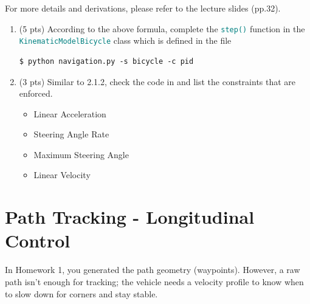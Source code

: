\documentclass[11pt]{article}
\begin{document}
For more details and derivations, please refer to the lecture slides (pp.32).
\begin{enumerate}
    \item \textbf{\faPython} (5 pts) According to the above formula, complete the \textcolor{teal}{\texttt{step()}} function in the \textcolor{teal}{\texttt{KinematicModelBicycle}} class which is defined in the file \textcolor{teal}{}
          \begin{lstlisting}
$ python navigation.py -s bicycle -c pid
          \end{lstlisting}
    \item \textbf{\faPen} (3 pts) Similar to 2.1.2, check the code in \textcolor{teal}{\texttt{\allowbreak{}}} and list the constraints that are enforced.
          \begin{itemize}
            \color{blue}
                \item Linear Acceleration
                \item Steering Angle Rate
                \item Maximum Steering Angle
                \item Linear Velocity
          \end{itemize}
\end{enumerate}

\section{Path Tracking - Longitudinal Control}
In Homework 1, you generated the path geometry (waypoints). However, a raw path isn't enough for tracking; the vehicle needs a velocity profile to know when to slow down for corners and stay stable.
\end{document}
